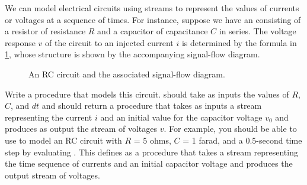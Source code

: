 \begin{exercise}
	\label{Exercise 3.73}
	We can model electrical circuits using streams to represent the values of currents or voltages at a sequence of times.
	For instance, suppose we have an  consisting of a resistor of resistance \( R \) and a capacitor of capacitance \( C \) in series.
	The voltage response \( v \) of the circuit to an injected current \( i \) is determined by the formula in \cref{Figure 3.33}, whose structure is shown by the accompanying signal-flow diagram.

	\begin{figure}[tb]
		\centering
		
		\caption{
			An RC circuit and the associated signal-flow diagram.
		}
		\label{Figure 3.33}
	\end{figure}

	Write a procedure  that models this circuit.
	 should take as inputs the values of \( R \), \( C \), and \( dt \) and should return a procedure that takes as inputs a stream representing the current \( i \) and an initial value for the capacitor voltage \( v_0 \) and produces as output the stream of voltages \( v \).
	For example, you should be able to use  to model an RC circuit with \( R \) = 5 ohms, \( C \) = 1 farad, and a 0.5-second time step by evaluating .
	This defines  as a procedure that takes a stream representing the time sequence of currents and an initial capacitor voltage and produces the output stream of voltages.
\end{exercise}



